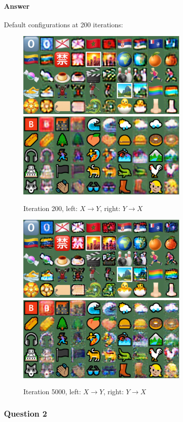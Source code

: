 \documentclass{article}
\begin{document}
	\paragraph{Answer} Default configurations at 200 iterations: 
	\begin{figure}[H]
		\centering
		\caption{Iteration 200, left: $X \to Y$, right: $Y \to X$}
		\includegraphics[width=0.45\linewidth]{./samples_cyclegan_Q1/sample-000200-X-Y.png}
		\includegraphics[width=0.45\linewidth]{./samples_cyclegan_Q1/sample-000200-Y-X.png}
	\end{figure}
	\begin{figure}[H]
		\centering
		\caption{Iteration 5000, left: $X \to Y$, right: $Y \to X$}
		\includegraphics[width=0.45\linewidth]{./samples_cyclegan_Q1/sample-005000-X-Y.png}
		\includegraphics[width=0.45\linewidth]{./samples_cyclegan_Q1/sample-005000-Y-X.png}
	\end{figure}

	\subsubsection{Question 2}
\end{document}
